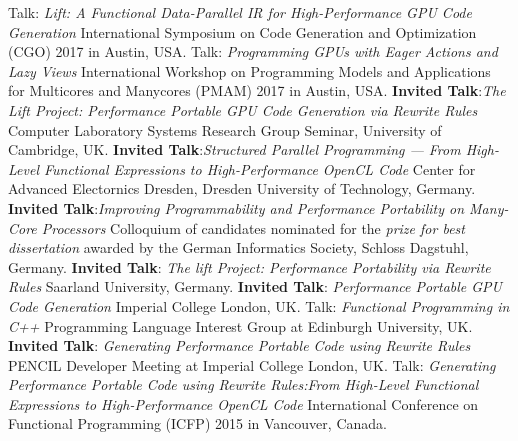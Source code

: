 \documentclass[11pt,a4paper]{moderncv}
\begin{document}
         {Talk: \emph{Lift: A Functional Data-Parallel IR for High-Performance GPU Code Generation}\newline
          \small International Symposium on Code Generation and Optimization (CGO) 2017 in Austin, USA.}
         {Talk: \emph{Programming GPUs with Eager Actions and Lazy Views}\newline
          \small  International Workshop on Programming Models and Applications for Multicores and Manycores (PMAM) 2017 in Austin, USA.}
         {\textbf{Invited Talk}:\newline \emph{The Lift Project: Performance Portable GPU Code Generation via Rewrite Rules}\newline
         Computer Laboratory Systems Research Group Seminar, University of Cambridge, UK.
         }
         {\textbf{Invited Talk}:\newline \emph{Structured Parallel Programming --- From High-Level Functional Expressions to High-Performance OpenCL Code}\newline
         Center for Advanced Electornics Dresden, Dresden University of Technology, Germany.
         }
         {\textbf{Invited Talk}:\newline \emph{Improving Programmability and Performance Portability on Many-Core Processors}\newline
         \small Colloquium of candidates nominated for the \emph{prize for best dissertation} awarded by the German Informatics Society, Schloss Dagstuhl, Germany.}
         {\textbf{Invited Talk}: \emph{The lift Project: Performance Portability via Rewrite Rules}\newline
          \small Saarland University, Germany.}
         {\textbf{Invited Talk}: \emph{Performance Portable GPU Code Generation}\newline
         \small Imperial College London, UK.}
         {Talk: \emph{Functional Programming in C++}\newline
         \small Programming Language Interest Group at Edinburgh University, UK.}
         {\textbf{Invited Talk}: \emph{Generating Performance Portable Code using Rewrite Rules}\newline
         \small PENCIL Developer Meeting at Imperial College London, UK.}
         {Talk: \emph{Generating Performance Portable Code using Rewrite Rules:\newline From High-Level Functional Expressions to High-Performance OpenCL Code}\newline
         \small International Conference on Functional Programming (ICFP) 2015 in Vancouver, Canada.}
\end{document}
